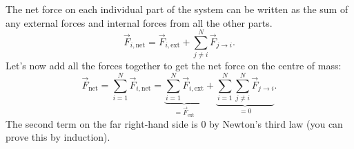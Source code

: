 \documentclass[../classical_mechanics.tex]{subfiles}
\begin{document}
        The net force on each individual part of the system can be written as the sum of any external forces and internal forces from all the other parts.
        \begin{equation}
            \vec{F}_{i,\text{net}}=\vec{F}_{i,\text{ext}}+\sum_{j\neq i}^N\vec{F}_{j\to i}.
        \end{equation}
        Let's now add all the forces together to get the net force on the centre of mass:
        \begin{equation}
            \vec{F}_\text{net} = \sum_{i=1}^N\vec{F}_{i,\text{net}} = \underbrace{\sum_{i=1}^N\vec{F}_{i,\text{ext}}}_{=\vec{F}_\text{ext}}+\underbrace{\sum_{i=1}^N\sum_{j\neq i}^N\vec{F}_{j\to i}}_{=0}.
        \end{equation}
        The second term on the far right-hand side is 0 by Newton's third law (you can prove this by induction).
        
\end{document}
